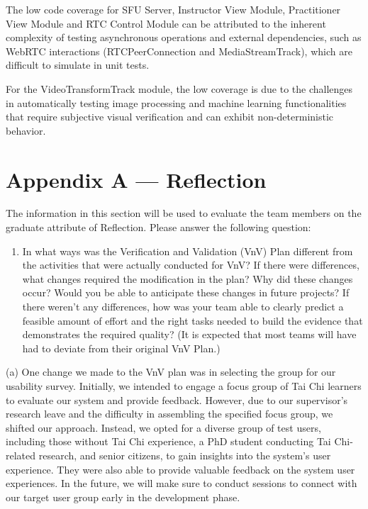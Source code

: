 \documentclass[12pt, titlepage]{article}
\begin{document}
The low code coverage for SFU Server, Instructor View Module, Practitioner View
Module and RTC Control Module can be attributed to the inherent complexity of
testing asynchronous operations and external dependencies, such as WebRTC
interactions (RTCPeerConnection and MediaStreamTrack), which are difficult to
simulate in unit tests.

For the VideoTransformTrack module, the low coverage is due to the challenges in
automatically testing image processing and machine learning functionalities that
require subjective visual verification and can exhibit non-deterministic
behavior.

\newpage{}
\section*{Appendix A --- Reflection}

The information in this section will be used to evaluate the team members on the
graduate attribute of Reflection.  Please answer the following question:

\begin{enumerate}
  \item In what ways was the Verification and Validation (VnV) Plan different
  from the activities that were actually conducted for VnV?  If there were
  differences, what changes required the modification in the plan?  Why did
  these changes occur?  Would you be able to anticipate these changes in future
  projects?  If there weren't any differences, how was your team able to clearly
  predict a feasible amount of effort and the right tasks needed to build the
  evidence that demonstrates the required quality?  (It is expected that most
  teams will have had to deviate from their original VnV Plan.)
\end{enumerate}

(a) One change we made to the VnV plan was in selecting the group for our
usability survey. Initially, we intended to engage a focus group of Tai Chi
learners to evaluate our system and provide feedback. However, due to our
supervisor's research leave and the difficulty in assembling the specified focus
group, we shifted our approach. Instead, we opted for a diverse group of test
users, including those without Tai Chi experience, a PhD student conducting Tai
Chi-related research, and senior citizens, to gain insights into the system's
user experience. They were also able to provide valuable feedback on the system
user experiences. In the future, we will make sure to conduct sessions to
connect with our target user group early in the development phase.
\end{document}
